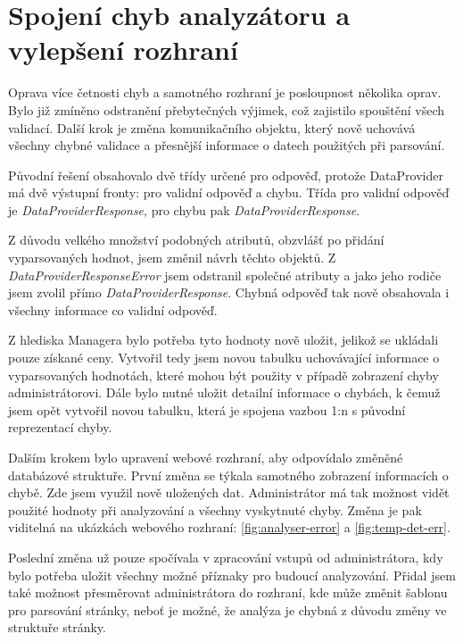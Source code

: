 \documentclass[thesis=B,czech]{FITthesis}[2012/06/26]
\begin{document}
\newpage 
\section{Spojení chyb analyzátoru a vylepšení rozhraní}
Oprava více četnosti chyb a samotného rozhraní je posloupnost několika oprav. 
Bylo již zmíněno odstranění přebytečných výjimek, což zajistilo spouštění všech validací. 
Další krok je změna komunikačního objektu, který nově uchovává všechny chybné validace a přesnější informace
o datech použitých při parsování.
\par
Původní řešení obsahovalo dvě třídy určené pro odpověď, protože DataProvider má dvě výstupní fronty: pro validní odpověď a chybu. 
Třída pro validní odpověď je \textit{DataProviderResponse}, pro chybu pak \textit{DataProviderResponse}.
\par
Z důvodu velkého množství podobných atributů, obzvlášť po přidání vyparsovaných hodnot, jsem změnil návrh těchto objektů.
Z \textit{DataProviderResponseError} jsem odstranil společné atributy a jako jeho rodiče jsem zvolil přímo \textit{DataProviderResponse}.
Chybná odpověď tak nově obsahovala i všechny informace co validní odpověď. 
\par
Z hlediska Managera bylo potřeba tyto hodnoty nově uložit, jelikož se ukládali pouze získané ceny. Vytvořil tedy jsem novou tabulku
uchovávající informace o vyparsovaných hodnotách, které mohou být použity v případě zobrazení chyby administrátorovi.
Dále bylo nutné uložit detailní informace o chybách, k čemuž jsem opět vytvořil novou tabulku, která je spojena vazbou 1:n s původní
reprezentací chyby.
\par
Dalším krokem bylo upravení webové rozhraní, aby odpovídalo změněné databázové struktuře. První změna se týkala samotného zobrazení
informacích o chybě. Zde jsem využil nově uložených dat. Administrátor má tak možnost vidět použité hodnoty při analyzování a všechny
vyskytnuté chyby. Změna je pak viditelná na ukázkách webového rozhraní: \ref{fig:analyser-error} a \ref{fig:temp-det-err}.
\par
Poslední změna už pouze spočívala v zpracování vstupů od administrátora, kdy bylo potřeba uložit všechny možné příznaky pro 
budoucí analyzování. Přidal jsem také možnost přesměrovat administrátora do rozhraní, kde může změnit šablonu pro parsování
stránky, neboť je možné, že analýza je chybná z důvodu změny ve struktuře stránky.
\par
\end{document}
